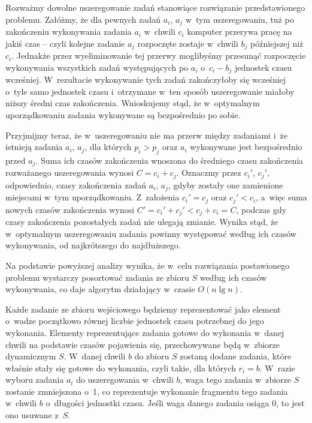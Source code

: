 
\subproblem %
Rozważmy dowolne uszeregowanie zadań stanowiące rozwiązanie przedstawionego problemu.
Załóżmy, że dla pewnych zadań $a_i$, $a_j$ w~tym uszeregowaniu, tuż po zakończeniu wykonywania zadania $a_i$ w~chwili $c_i$ komputer przerywa pracę na jakiś czas -- czyli kolejne zadanie $a_j$ rozpoczęte zostaje w~chwili $b_j$ późniejszej niż $c_i$.
Jednakże przez wyeliminowanie tej przerwy moglibyśmy przesunąć rozpoczęcie wykonywania wszystkich zadań występujących po $a_i$ o~$c_i-b_j$ jednostek czasu wcześniej.
W~rezultacie wykonywanie tych zadań zakończyłoby się wcześniej o~tyle samo jednostek czasu i~otrzymane w~ten sposób uszeregowanie miałoby niższy średni czas zakończenia.
Wnioskujemy stąd, że w~optymalnym uporządkowaniu zadania wykonywane są bezpośrednio po sobie.

Przyjmijmy teraz, że w~uszeregowaniu nie ma przerw między zadaniami i~że istnieją zadania $a_i$, $a_j$, dla których $p_i>p_j$ oraz $a_i$ wykonywane jest bezpośrednio przed $a_j$.
Suma ich czasów zakończenia wnoszona do średniego czasu zakończenia rozważanego uszeregowania wynosi $C=c_i+c_j$.
Oznaczmy przez $c_i'$, $c_j'$, odpowiednio, czasy zakończenia zadań $a_i$, $a_j$, gdyby zostały one zamienione miejscami w~tym uporządkowaniu.
Z~założenia $c_i'=c_j$ oraz $c_j'<c_i$, a~więc suma nowych czasów zakończenia wynosi $C'=c_i'+c_j'<c_j+c_i=C$, podczas gdy czasy zakończenia pozostałych zadań nie ulegają zmianie.
Wynika stąd, że w~optymalnym uszeregowaniu zadania powinny występować według ich czasów wykonywania, od najkrótszego do najdłuższego.

Na podstawie powyższej analizy wynika, że w~celu rozwiązania postawionego problemu wystarczy posortować zadania ze zbioru $S$ według ich czasów wykonywania, co daje algorytm działający w~czasie $O(n\lg n)$.

\subproblem %
Każde zadanie ze zbioru wejściowego będziemy reprezentować jako element o~wadze początkowo równej liczbie jednostek czasu potrzebnej do jego wykonania.
Elementy reprezentujące zadania gotowe do wykonania w~danej chwili na podstawie czasów pojawienia się, przechowywane będą w~zbiorze dynamicznym $S$.
W~danej chwili $b$ do zbioru $S$ zostaną dodane zadania, które właśnie stały się gotowe do wykonania, czyli takie, dla których $r_i=b$.
W~razie wyboru zadania $a_i$ do uszeregowania w~chwili $b$, waga tego zadania w~zbiorze $S$ zostanie zmniejszona o~1, co reprezentuje wykonanie fragmentu tego zadania w~chwili $b$ o~długości jednostki czasu.
Jeśli waga danego zadania osiąga 0, to jest ono usuwane z~$S$.

